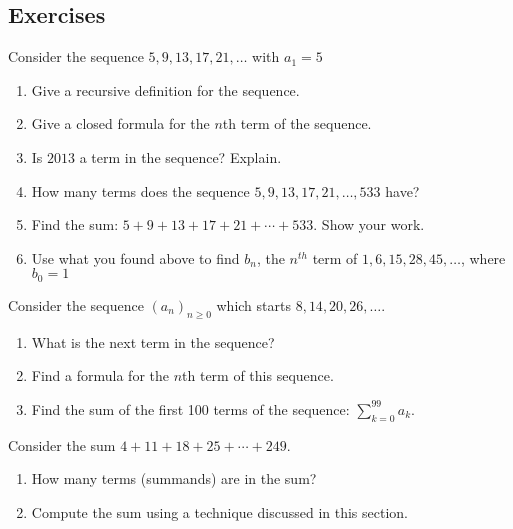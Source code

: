 \documentclass[11pt,]{book}
\theoremstyle{ptxplainnotitle}
\theoremstyle{ptxplaintitle}
\theoremstyle{ptxdefinitionnotitle}
\theoremstyle{ptxdefinitiontitle}
\theoremstyle{ptxdefinitionnotitle}
\theoremstyle{ptxdefinitiontitle}
\theoremstyle{ptxdefinitionnotitle}
\theoremstyle{ptxdefinitiontitle}
\theoremstyle{ptxdefinitiontitlenonumber}
\theoremstyle{ptxdefinitiontitlenonumber}
\numberwithin{equation}{chapter}
\begin{document}
\subsection*{Exercises}\hypertarget{exercises_seq-arithgeom}{}
\begin{divisionexercise}{1}\hypertarget{exercise-13}{}
\hypertarget{p-221}{}%
Consider the sequence \(5, 9, 13, 17, 21, \ldots\) with \(a_1 = 5\) \leavevmode%
\begin{enumerate}[label=(\alph*)]
\item\hypertarget{li-120}{}\hypertarget{p-222}{}%
Give a recursive definition for the sequence.%
\item\hypertarget{li-121}{}\hypertarget{p-223}{}%
Give a closed formula for the \(n\)th term of the sequence.%
\item\hypertarget{li-122}{}\hypertarget{p-224}{}%
Is \(2013\) a term in the sequence? Explain.%
\item\hypertarget{li-123}{}\hypertarget{p-225}{}%
How many terms does the sequence \(5, 9, 13, 17, 21, \ldots, 533\) have?%
\item\hypertarget{li-124}{}\hypertarget{p-226}{}%
Find the sum: \(5 + 9 + 13 + 17 + 21 + \cdots + 533\). Show your work.%
\item\hypertarget{li-125}{}\hypertarget{p-227}{}%
Use what you found above to find \(b_n\), the \(n^{th}\) term of \(1, 6, 15, 28, 45, \ldots\), where \(b_0 = 1\)%
\end{enumerate}
%
\end{divisionexercise}%
\begin{divisionexercise}{2}\hypertarget{exercise-14}{}
\hypertarget{p-239}{}%
Consider the sequence \((a_n)_{n \ge 0}\) which starts \(8, 14, 20, 26, \ldots\text{.}\) \leavevmode%
\begin{enumerate}[label=(\alph*)]
\item\hypertarget{li-138}{}\hypertarget{p-240}{}%
What is the next term in the sequence?%
\item\hypertarget{li-139}{}\hypertarget{p-242}{}%
Find a formula for the \(n\)th term of this sequence.%
\item\hypertarget{li-140}{}\hypertarget{p-243}{}%
Find the sum of the first 100 terms of the sequence: \(\sum_{k=0}^{99}a_k\text{.}\)%
\end{enumerate}
%
\end{divisionexercise}%
\begin{divisionexercise}{3}\hypertarget{exercise-15}{}
\hypertarget{p-256}{}%
Consider the sum \(4 + 11 + 18 + 25 + \cdots + 249\text{.}\) \leavevmode%
\begin{enumerate}[label=(\alph*)]
\item\hypertarget{li-148}{}\hypertarget{p-257}{}%
How many terms (summands) are in the sum?%
\item\hypertarget{li-149}{}\hypertarget{p-259}{}%
Compute the sum using a technique discussed in this section.%
\end{enumerate}
%
\end{divisionexercise}%
\end{document}
